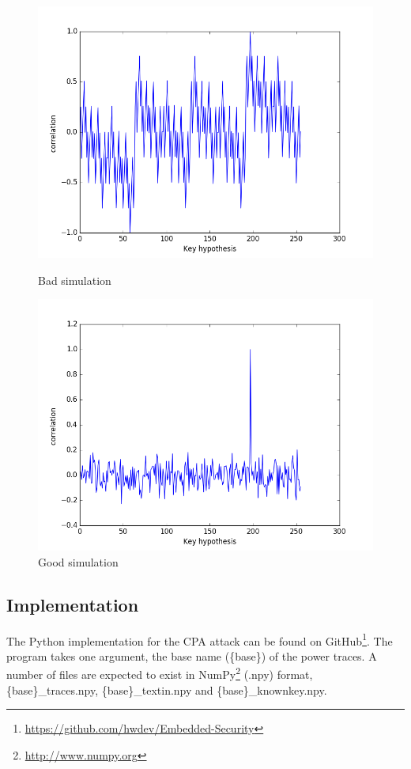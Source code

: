 \documentclass{article}
\begin{document}
\begin{figure}[ht]
  \centering
  \begin{minipage}[b]{0.45\linewidth}
    \includegraphics[scale=0.35]{bad_simulation.png}
    \caption{Bad simulation}
    \label{fig:bad_sim}
  \end{minipage}
  \quad
  \begin{minipage}[b]{0.45\linewidth}
    \includegraphics[scale=0.35]{good_simulation.png}
    \caption{Good simulation}
    \label{fig:good_sim}
  \end{minipage}
\end{figure}

\subsection{Implementation}
The Python implementation for the CPA attack can be found on GitHub\footnote{\url{https://github.com/hwdev/Embedded-Security}}. The program takes one argument, the base name (\{base\}) of the power traces. A number of files are expected to exist in NumPy\footnote{\url{http://www.numpy.org}} (.npy) format, \{base\}\_traces.npy, \{base\}\_textin.npy and \{base\}\_knownkey.npy.
\end{document}
